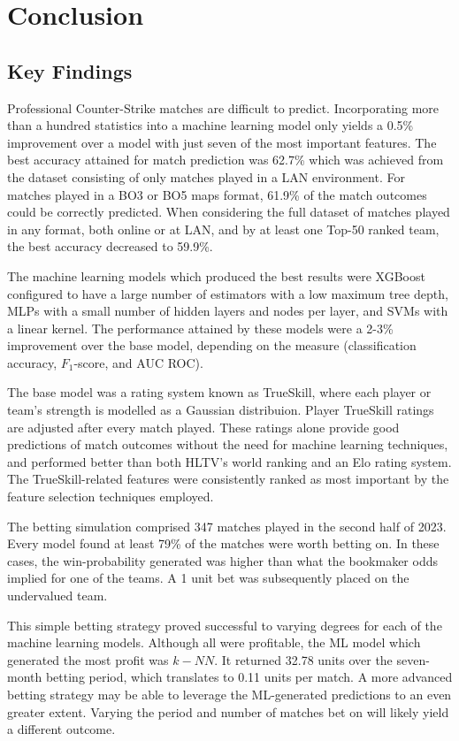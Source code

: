 \chapter{Conclusion}
\label{Conclusion}

\section{Key Findings}

Professional Counter-Strike matches are difficult to predict. Incorporating more than a hundred statistics into a machine learning model only yields a 0.5\% improvement over a model with just seven of the most important features. The best accuracy attained for match prediction was 62.7\% which was achieved from the dataset consisting of only matches played in a LAN environment. For matches played in a BO3 or BO5 maps format, 61.9\% of the match outcomes could be correctly predicted. When considering the full dataset of matches played in any format, both online or at LAN, and by at least one Top-50 ranked team, the best accuracy decreased to 59.9\%.

The machine learning models which produced the best results were XGBoost configured to have a large number of estimators with a low maximum tree depth, MLPs with a small number of hidden layers and nodes per layer, and SVMs with a linear kernel. The performance attained by these models were a 2-3\% improvement over the base model, depending on the measure (classification accuracy, $F_1$-score, and AUC ROC).

The base model was a rating system known as TrueSkill, where each player or team's strength is modelled as a Gaussian distribuion. Player TrueSkill ratings are adjusted after every match played. These ratings alone provide good predictions of match outcomes without the need for machine learning techniques, and performed better than both HLTV's world ranking and an Elo rating system. The TrueSkill-related features were consistently ranked as most important by the feature selection techniques employed.

The betting simulation comprised 347 matches played in the second half of 2023. Every model found at least 79\% of the matches were worth betting on. In these cases, the win-probability generated was higher than what the bookmaker odds implied for one of the teams. A 1 unit bet was subsequently placed on the undervalued team. 

This simple betting strategy proved successful to varying degrees for each of the machine learning models. Although all were profitable, the ML model which generated the most profit was $k-NN$. It returned 32.78 units over the seven-month betting period, which translates to 0.11 units per match. A more advanced betting strategy may be able to leverage the ML-generated predictions to an even greater extent. Varying the period and number of matches bet on will likely yield a different outcome.

